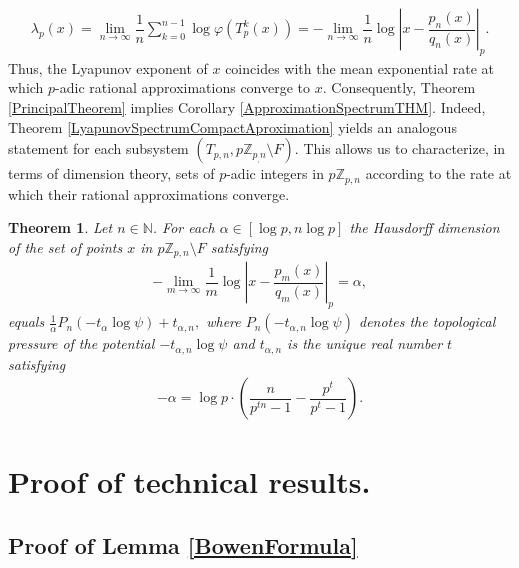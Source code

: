 \documentclass[11pt]{amsart}
\newtheorem{theorem}{Theorem}[section]
\theoremstyle{remark}
\numberwithin{equation}{section}
\newcommand{\N}{\mathbb{N}}
\newcommand{\Z}{\mathbb{Z}}
\begin{document}
\begin{align*}
     \lambda_{p}(x)=\lim_{n\to \infty}\dfrac{1}{n}\sum^{n-1}_{k=0}\log\varphi(T_{p}^{k}(x))=-\lim_{n\to \infty}\dfrac{1}{n}\log \left|x-\dfrac{p_{n}(x)}{q_{n}(x)}\right|_{p}.
\end{align*}Thus, the Lyapunov exponent of $x$ coincides with the mean exponential rate at which $p$-adic rational approximations converge to $x$. Consequently, Theorem \ref{PrincipalTheorem} implies Corollary \ref{ApproximationSpectrumTHM}. Indeed, Theorem \ref{LyapunovSpectrumCompactAproximation} yields an analogous statement for each subsystem $(T_{p,n},p\Z_{p_,n}\setminus F)$. This allows us to characterize, in terms of dimension theory, sets of $p$-adic integers in $p\Z_{p,n}$ according to the rate at which their rational approximations converge.
\begin{theorem}
    Let $n\in \N$. For each $\alpha\in [\log p,n\log p]$ the Hausdorff dimension of the set of points $x$ in $p\Z_{p,n}\setminus F$ satisfying
    \begin{align*}
        -\lim_{m\to \infty}\dfrac{1}{m}\log \left|x-\dfrac{p_{m}(x)}{q_{m}(x)}\right|_{p}=\alpha,
    \end{align*} equals $\frac{1}{\alpha}P_{n}(-t_{\alpha}\log\psi)+t_{\alpha,n},$ where $P_{n}(-t_{\alpha,n}\log \psi)$ denotes the topological pressure of the potential $-t_{\alpha,n}\log \psi$ and $t_{\alpha,n}$ is the unique real number $t$ satisfying 
    \begin{align*}
        -\alpha=\log p\cdot \left(\dfrac{n}{p^{tn}-1}-\dfrac{p^{t}}{p^{t}-1}\right).
    \end{align*}
\end{theorem}


\section{Proof of technical results.}
\subsection{Proof of Lemma \ref{BowenFormula}}
 
\end{document}
